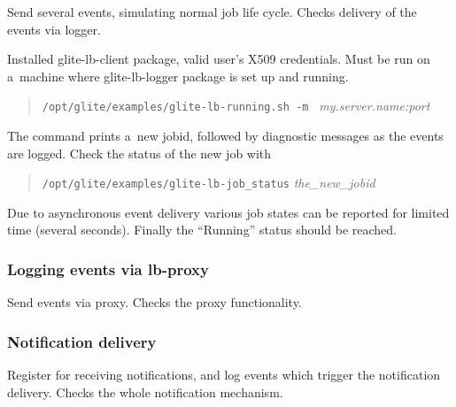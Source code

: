 Send several \LB events, simulating normal job life cycle.
Checks delivery of the events via \LB logger.

\req Installed glite-lb-client package, valid user's X509 credentials.
Must be run on a~machine where glite-lb-logger package is set up and running.

\how
\begin{quote}
\verb'/opt/glite/examples/glite-lb-running.sh -m ' \emph{my.server.name:port}
\end{quote}

The command prints a~new jobid, followed by diagnostic messages as the events are logged. 
Check the status of the new job with
\begin{quote}
\verb'/opt/glite/examples/glite-lb-job_status' \emph{the\_\/new\_\/jobid}
\end{quote}

\result
Due to asynchronous event
delivery various job states can be reported for limited time (several seconds).
Finally the
``Running'' status should be reached.

\subsubsection{Logging events via lb-proxy}

Send events via \LB proxy. Checks the proxy functionality.

\TODO{}

\subsubsection{Notification delivery}

Register for receiving notifications, and log events which trigger
the notification delivery. Checks the whole notification mechanism.

